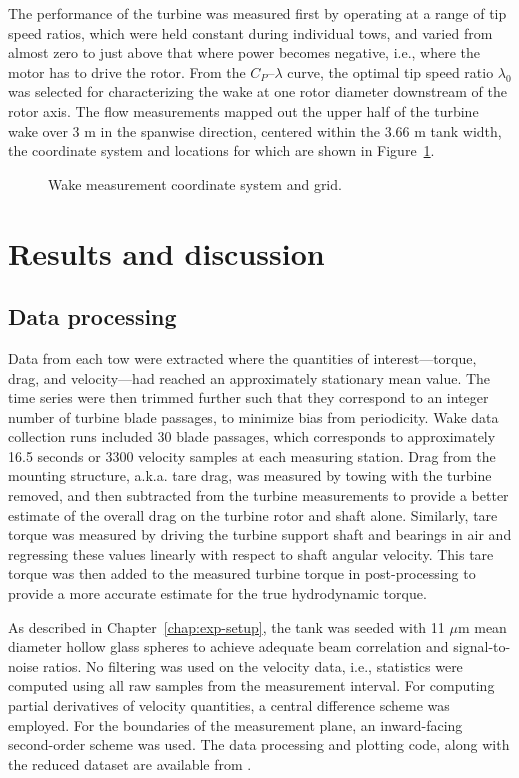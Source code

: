 The performance of the turbine was measured first by operating at a range of tip
speed ratios, which were held constant during individual tows, and varied from
almost zero to just above that where power becomes negative, i.e., where the
motor has to drive the rotor. From the $C_P$--$\lambda$ curve, the optimal tip
speed ratio $\lambda_0$ was selected for characterizing the wake at one rotor
diameter downstream of the rotor axis. The flow measurements mapped out the
upper half of the turbine wake over 3 m in the spanwise direction, centered
within the 3.66 m tank width, the coordinate system and locations for which are
shown in Figure~\ref{fig:RVAT-baseline-wake-coordinates}.

\begin{figure}
    \caption{Wake measurement coordinate system and grid.}
    \label{fig:RVAT-baseline-wake-coordinates}
\end{figure}


\section{Results and discussion}

\subsection{Data processing}

Data from each tow were extracted where the quantities of interest---torque,
drag, and velocity---had reached an approximately stationary mean value. The
time series were then trimmed further such that they correspond to an integer
number of turbine blade passages, to minimize bias from periodicity. Wake data
collection runs included 30 blade passages, which corresponds to approximately
16.5 seconds or 3300 velocity samples at each measuring station. Drag from the
mounting structure, a.k.a. tare drag, was measured by towing with the turbine
removed, and then subtracted from the turbine measurements to provide a better
estimate of the overall drag on the turbine rotor and shaft alone. Similarly,
tare torque was measured by driving the turbine support shaft and bearings in
air and regressing these values linearly with respect to shaft angular velocity.
This tare torque was then added to the measured turbine torque in
post-processing to provide a more accurate estimate for the true hydrodynamic
torque.

As described in Chapter~\ref{chap:exp-setup}, the tank was seeded with 11 $\mu$m
mean diameter hollow glass spheres to achieve adequate beam correlation and
signal-to-noise ratios. No filtering was used on the velocity data, i.e.,
statistics were computed using all raw samples from the measurement interval.
For computing partial derivatives of velocity quantities, a central difference
scheme was employed. For the boundaries of the measurement plane, an
inward-facing second-order scheme was used. The data processing and plotting
code, along with the reduced dataset are available from
\cite{Bachant2014-RVAT-baseline}.


